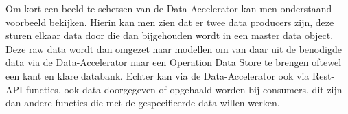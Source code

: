 Om kort een beeld te schetsen van de Data-Accelerator kan men onderstaand voorbeeld bekijken. Hierin kan men zien dat er twee data producers zijn, deze sturen elkaar data door die dan bijgehouden wordt in een master data object. Deze raw data wordt dan omgezet naar modellen om van daar uit de benodigde data via de Data-Accelerator naar een Operation Data Store te brengen oftewel een kant en klare databank. Echter kan via de Data-Accelerator ook via Rest-API functies, ook data doorgegeven of opgehaald worden bij consumers, dit zijn dan andere functies die met de gespecifieerde data willen werken.